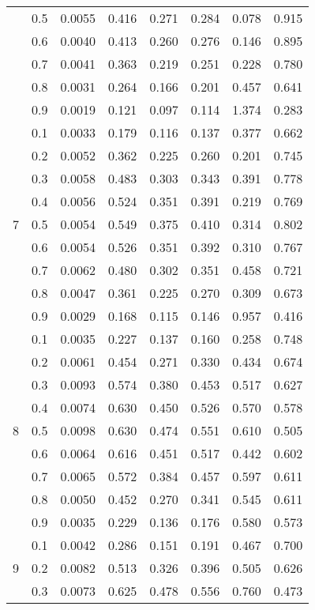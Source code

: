 \documentclass[11pt,a4paper]{report}
\begin{document}
\begin{longtable}{ | c | c || c | c | c | c | c | c | }
 & 0.5 & 0.0055 & 0.416 & 0.271 & 0.284 & 0.078 & 0.915 \\
 & 0.6 & 0.0040 & 0.413 & 0.260 & 0.276 & 0.146 & 0.895 \\
 & 0.7 & 0.0041 & 0.363 & 0.219 & 0.251 & 0.228 & 0.780 \\
 & 0.8 & 0.0031 & 0.264 & 0.166 & 0.201 & 0.457 & 0.641 \\
 & 0.9 & 0.0019 & 0.121 & 0.097 & 0.114 & 1.374 & 0.283 \\
 \hline
\multirow{9}{*}{7} & 0.1 & 0.0033 & 0.179 & 0.116 & 0.137 & 0.377 & 0.662 \\
 & 0.2 & 0.0052 & 0.362 & 0.225 & 0.260 & 0.201 & 0.745 \\
 & 0.3 & 0.0058 & 0.483 & 0.303 & 0.343 & 0.391 & 0.778 \\
 & 0.4 & 0.0056 & 0.524 & 0.351 & 0.391 & 0.219 & 0.769 \\
 & 0.5 & 0.0054 & 0.549 & 0.375 & 0.410 & 0.314 & 0.802 \\
 & 0.6 & 0.0054 & 0.526 & 0.351 & 0.392 & 0.310 & 0.767 \\
 & 0.7 & 0.0062 & 0.480 & 0.302 & 0.351 & 0.458 & 0.721 \\
 & 0.8 & 0.0047 & 0.361 & 0.225 & 0.270 & 0.309 & 0.673 \\
 & 0.9 & 0.0029 & 0.168 & 0.115 & 0.146 & 0.957 & 0.416 \\
 \hline
\multirow{9}{*}{8} & 0.1 & 0.0035 & 0.227 & 0.137 & 0.160 & 0.258 & 0.748 \\
 & 0.2 & 0.0061 & 0.454 & 0.271 & 0.330 & 0.434 & 0.674 \\
 & 0.3 & 0.0093 & 0.574 & 0.380 & 0.453 & 0.517 & 0.627 \\
 & 0.4 & 0.0074 & 0.630 & 0.450 & 0.526 & 0.570 & 0.578 \\
 & 0.5 & 0.0098 & 0.630 & 0.474 & 0.551 & 0.610 & 0.505 \\
 & 0.6 & 0.0064 & 0.616 & 0.451 & 0.517 & 0.442 & 0.602 \\
 & 0.7 & 0.0065 & 0.572 & 0.384 & 0.457 & 0.597 & 0.611 \\
 & 0.8 & 0.0050 & 0.452 & 0.270 & 0.341 & 0.545 & 0.611 \\
 & 0.9 & 0.0035 & 0.229 & 0.136 & 0.176 & 0.580 & 0.573 \\
 \hline
\multirow{9}{*}{9} & 0.1 & 0.0042 & 0.286 & 0.151 & 0.191 & 0.467 & 0.700 \\
 & 0.2 & 0.0082 & 0.513 & 0.326 & 0.396 & 0.505 & 0.626 \\
 & 0.3 & 0.0073 & 0.625 & 0.478 & 0.556 & 0.760 & 0.473 \\

\end{longtable}
\end{document}
